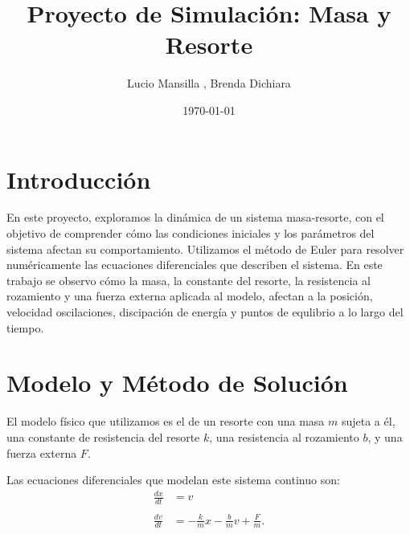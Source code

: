 \documentclass{article}
\title{Proyecto de Simulación: Masa y Resorte}
\author{Lucio Mansilla , Brenda Dichiara}
\date{\today}
\begin{document}
\maketitle

\section{Introducción}
En este proyecto, exploramos la dinámica de un sistema masa-resorte, con el objetivo de comprender cómo las condiciones iniciales y los parámetros del sistema afectan su comportamiento. Utilizamos el método de Euler para resolver numéricamente las ecuaciones diferenciales que describen el sistema. En este trabajo se observo cómo la masa, la constante del resorte, la resistencia al rozamiento y una fuerza externa aplicada al modelo, afectan a la posición, velocidad oscilaciones, discipación de energía y puntos de equlibrio a lo largo del tiempo.

\section{Modelo y Método de Solución}
El modelo físico que utilizamos es el de un resorte con una masa $m$ sujeta a él, una constante de resistencia del resorte $k$, una resistencia al rozamiento $b$, y una fuerza externa $F$.

\vspace{0.1cm}
\begin{center}
\end{center}
Las ecuaciones diferenciales que modelan este sistema continuo son:
\begin{align*}
    \frac{dx}{dt} & = v \\\\ 
    \frac{dv}{dt} & = -\frac{k}{m}x - \frac{b}{m}v + \frac{F}{m}.
\end{align*}
\end{document}
